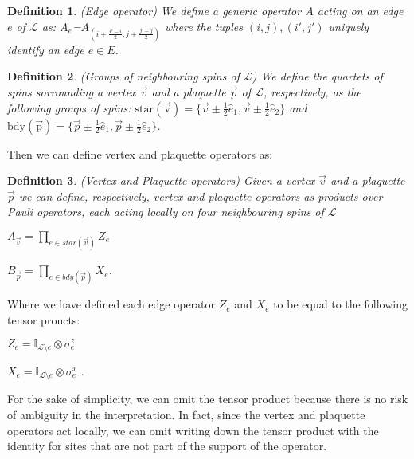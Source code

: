 \documentclass{Configuration_Files/PoliMi3i_thesis}
\newtheorem{definition}{Definition}[chapter]
\begin{document}
\begin{definition} (Edge operator) 
	We define a generic operator $A$ acting on an edge $e$ of $\mathcal{L}$ as: $A_e$=$A_{(i+\frac{i'-i}{2}, j+\frac{j'-j}{2})}$ where the tuples $(i,j),(i',j')$ uniquely identify an edge $e\in E$.
\end{definition}

\begin{definition} (Groups of neighbouring spins of $\mathcal{L}$) We define the quartets of spins sorrounding a vertex $\vec{v}$ and a plaquette $\vec{p}$ of $\mathcal{L}$, respectively, as the following groups of spins: $\mathrm{star(\vec{v})}=\{ \vec{v} \pm \frac{1}{2}\hat{e}_1, \vec{v} \pm \frac{1}{2}\hat{e}_2\}$ and $\mathrm{bdy(\vec{p})} =\{ \vec{p} \pm \frac{1}{2}\hat{e}_1, \vec{p} \pm \frac{1}{2}\hat{e}_2 \} $.
\end{definition}

Then we can define vertex and plaquette operators as:

\begin{definition} (Vertex and Plaquette operators) Given a vertex $\vec{v}$ and a plaquette $\vec{p}$ we can define, respectively, vertex and plaquette operators as products over Pauli operators, each acting locally on four neighbouring spins of $\mathcal{L}$
	
\begin{center}
	$ A_{\vec{v}} = \prod_{e \in star(\vec{v})} Z_e $ 
	
	$ B_{\vec{p}} = \prod_{e \in bdy(\vec{p})} X_e $.
\end{center}
\end{definition}

Where we have defined each edge operator $Z_e$ and $X_e$ to be equal to the following tensor proucts:

\begin{center}
	
	$Z_e = \mathbb{I}_{\mathcal{L} \setminus  e} \otimes \sigma^z_{e}$ 
	
	$X_e = \mathbb{I}_{\mathcal{L} \setminus  e} \otimes \sigma^x_{e} $ .
	
\end{center}


For the sake of simplicity, we can omit the tensor product because there is no risk of ambiguity in the interpretation. In fact, since the vertex and plaquette operators act locally, we can omit writing down the tensor product with the identity for sites that are not part of the support of the operator. 
 
\end{document}

